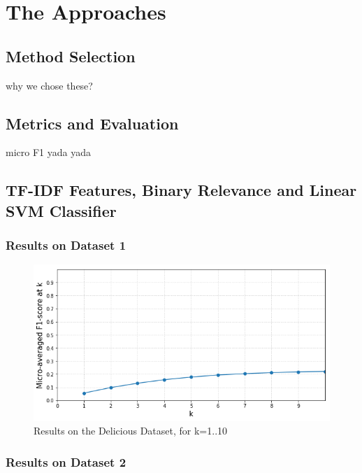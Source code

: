 \section{The Approaches}\label{section:datasets}

\subsection{Method Selection}

why we chose these?

\subsection{Metrics and Evaluation}

micro F1 yada yada


\subsection{TF-IDF Features, Binary Relevance and Linear SVM Classifier}



\subsubsection{Results on Dataset 1}

\begin{figure}[!h]
    \centering
    \includegraphics[width=\textwidth]{chapters/05_experiments/images/ovr_svm_delicious.png}
    \caption{Results on the Delicious Dataset, for k=1..10}
    \label{fig:ovr_svm_delicious}
\end{figure}

\subsubsection{Results on Dataset 2}

